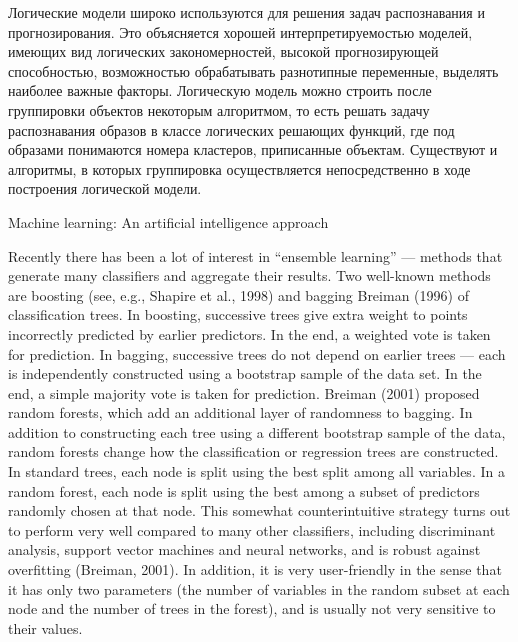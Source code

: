 Логические модели широко используются для решения задач распознавания и прогнозирования. Это объясняется хорошей интерпретируемостью моделей, имеющих вид логических закономерностей, высокой прогнозирующей способностью, возможностью обрабатывать разнотипные переменные, выделять наиболее важные факторы. Логическую модель можно строить после группировки объектов некоторым алгоритмом, то есть решать задачу распознавания образов в классе логических решающих функций, где под образами понимаются номера кластеров, приписанные объектам. Существуют и алгоритмы, в которых группировка осуществляется непосредственно в ходе построения логической модели. \cite{бериков2008современные}

Machine learning: An artificial intelligence approach\cite{michalski2013machine}

Recently there has been a lot of interest in “ensemble learning” — methods that generate many classifiers and aggregate their results. Two well-known methods are boosting (see, e.g., Shapire et al., 1998) and bagging Breiman (1996) of classification trees. In boosting, successive trees give extra weight to points incorrectly predicted by earlier predictors. In the end, a weighted vote is taken for prediction. In bagging, successive trees do not depend on earlier trees — each is independently constructed using a bootstrap sample of the data set. In the end, a simple majority vote is taken for prediction. Breiman (2001) proposed random forests, which add an additional layer of randomness to bagging. In addition to constructing each tree using a different bootstrap sample of the data, random forests change how the classification or regression trees are constructed. In standard trees, each node is split using the best split among all variables. In a random forest, each node is split using the best among a subset of predictors randomly chosen at that node. This somewhat counterintuitive strategy turns out to perform very well compared to many other classifiers, including discriminant analysis, support vector machines and neural networks, and is robust against overfitting (Breiman, 2001). In addition, it is very user-friendly in the sense that it has only two parameters (the number of variables in the random subset at each node and the number of trees in the forest), and is usually not very sensitive to their values. \cite{liaw2002classification}



